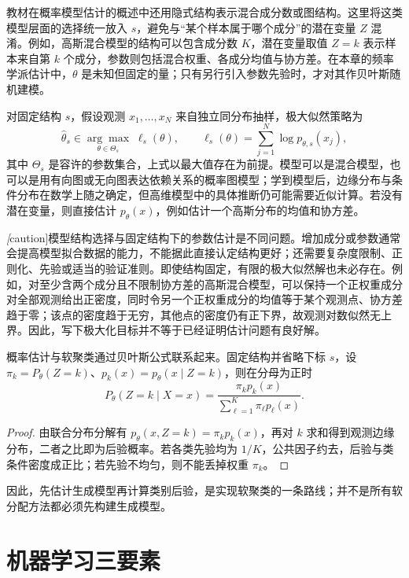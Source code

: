 教材在概率模型估计的概述中还用隐式结构表示混合成分数或图结构。这里将这类模型层面的选择统一放入 $s$，避免与“某个样本属于哪个成分”的潜在变量 $Z$ 混淆。例如，高斯混合模型的结构可以包含成分数 $K$，潜在变量取值 $Z=k$ 表示样本来自第 $k$ 个成分，参数则包括混合权重、各成分均值与协方差。在本章的频率学派估计中，$\theta$ 是未知但固定的量；只有另行引入参数先验时，才对其作贝叶斯随机建模。

对固定结构 $s$，假设观测 $x_1,\ldots,x_N$ 来自独立同分布抽样，极大似然策略为
\begin{equation}
\widehat\theta_s\in\underset{\theta\in\Theta_s}{\arg\max}\;
\ell_s(\theta),\qquad
\ell_s(\theta)=\sum_{j=1}^N\log p_{\theta,s}(x_j),
\label{eq:lh-unsup-likelihood}
\end{equation}
其中 $\Theta_s$ 是容许的参数集合，上式以最大值存在为前提。模型可以是混合模型，也可以是用有向图或无向图表达依赖关系的概率图模型；学到模型后，边缘分布与条件分布在数学上随之确定，但高维模型中的具体推断仍可能需要近似计算。若没有潜在变量，则直接估计 $p_\theta(x)$，例如估计一个高斯分布的均值和协方差。

\emph[caution]{模型结构选择与固定结构下的参数估计是不同问题。}增加成分或参数通常会提高模型拟合数据的能力，不能据此直接认定结构更好；还需要复杂度限制、正则化、先验或适当的验证准则。即使结构固定，有限的极大似然解也未必存在。例如，对至少含两个成分且不限制协方差的高斯混合模型，可以保持一个正权重成分对全部观测给出正密度，同时令另一个正权重成分的均值等于某个观测点、协方差趋于零；该点的密度趋于无穷，其他点的密度仍有正下界，故观测对数似然无上界。因此，写下极大化目标并不等于已经证明估计问题有良好解。

概率估计与软聚类通过贝叶斯公式联系起来。固定结构并省略下标 $s$，设 $\pi_k=P_\theta(Z=k)$、$p_k(x)=p_\theta(x\mid Z=k)$，则在分母为正时
\begin{equation}
P_\theta(Z=k\mid X=x)
=\frac{\pi_kp_k(x)}{\sum_{\ell=1}^K\pi_\ell p_\ell(x)}.
\label{eq:lh-unsup-bayes-clustering}
\end{equation}
\begin{proof}
由联合分布分解有 $p_\theta(x,Z=k)=\pi_kp_k(x)$，再对 $k$ 求和得到观测边缘分布，二者之比即为后验概率。若各类先验均为 $1/K$，公共因子约去，后验与类条件密度成正比；若先验不均匀，则不能丢掉权重 $\pi_k$。
\end{proof}
因此，先估计生成模型再计算类别后验，是实现软聚类的一条路线；并不是所有软分配方法都必须先构建生成模型。

\section{机器学习三要素}
\label{sec:lh-unsup-three-elements}

